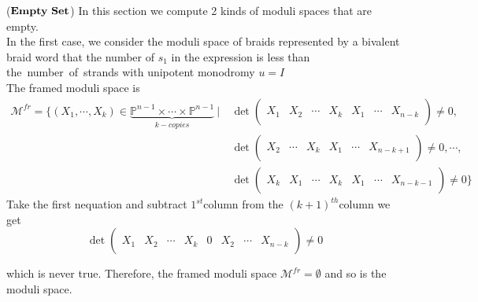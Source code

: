 \begin{example}
	($\bf{Empty~Set}$) In this section we compute 2 kinds of moduli spaces that are empty.\\
	In the first case, we consider the moduli space of braids represented by a bivalent braid word that the number of  $s_1$ in the expression is less than the~number~of~strands with unipotent monodromy $u=I$\\
The framed moduli space is 
		\begin{align*}
		\mathcal{M}^{fr}=
		\{(X_1,\cdots,X_{k}) \in 										\underbrace{\mathbb{P}^{n-1}\times \cdots \times \mathbb{P}			^{n-1}}_{k-copies}~|~		
		& \operatorname{det}
		\left( \begin{array}{c|c|c|c|c|c|c}
			& & & & & &\\
			X_1&X_2&\cdots&X_{k}&X_1&\cdots& X_{n-k}\\
			& & & & & &
		\end{array}\right)
		\neq 0, \\
		& \operatorname{det}
		\left( \begin{array}{c|c|c|c|c|c}
			& & & & &\\
			X_2&\cdots&X_{k}&X_1&\cdots& X_{n-k+1}\\
			& & & & &
		\end{array}\right)
		\neq 0,
		\cdots,\\
		& \operatorname{det}
		\left( \begin{array}{c|c|c|c|c|c|c}
			& & & & & &\\
			X_k&X_1&\cdots&X_{k}&X_1&\cdots&X_{n-k-1}\\
			& & & & & &
		\end{array}\right)
		\neq 0
		\}
	\end{align*}
Take the first nequation and subtract $1^{st}$column from the $(k+1)^{th}$column we get
\[
	\operatorname{det}
		\left( \begin{array}{c|c|c|c|c|c|c|c}
		&   &   &      &      & &   &                \\
		X_1 &X_2&\cdots&X_{k} &0 &X_2&\cdots&X_{n-k}\\
		&   &   &      &      & &   &
		\end{array}\right)
		\neq 0
\]

which is never true. Therefore, the framed moduli  space $\mathcal{M}^{fr}=\emptyset$ and so is the moduli space.\\


\end{example}
